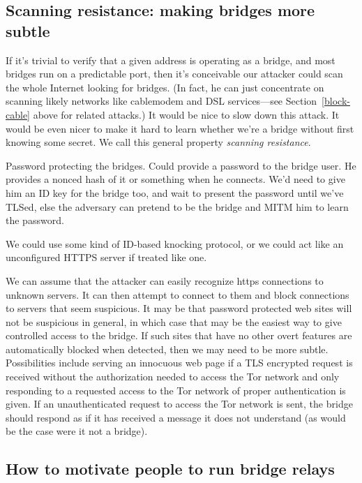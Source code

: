 \documentclass{llncs}
\begin{document}
\subsection{Scanning resistance: making bridges more subtle}

If it's trivial to verify that a given address is operating as a bridge,
and most bridges run on a predictable port, then it's conceivable our
attacker could scan the whole Internet looking for bridges. (In fact, he
can just concentrate on scanning likely networks like cablemodem and DSL
services---see Section~\ref{block-cable} above for related attacks.) It
would be nice to slow down this attack. It would be even nicer to make
it hard to learn whether we're a bridge without first knowing some
secret. We call this general property \emph{scanning resistance}.

Password protecting the bridges.
Could provide a password to the bridge user. He provides a nonced hash of
it or something when he connects. We'd need to give him an ID key for the
bridge too, and wait to present the password until we've TLSed, else the
adversary can pretend to be the bridge and MITM him to learn the password.

We could use some kind of ID-based knocking protocol, or we could act like an
unconfigured HTTPS server if treated like one.

We can assume that the attacker can easily recognize https connections
to unknown servers. It can then attempt to connect to them and block
connections to servers that seem suspicious. It may be that password
protected web sites will not be suspicious in general, in which case
that may be the easiest way to give controlled access to the bridge.
If such sites that have no other overt features are automatically
blocked when detected, then we may need to be more subtle.
Possibilities include serving an innocuous web page if a TLS encrypted
request is received without the authorization needed to access the Tor
network and only responding to a requested access to the Tor network
of proper authentication is given. If an unauthenticated request to
access the Tor network is sent, the bridge should respond as if
it has received a message it does not understand (as would be the
case were it not a bridge).


\subsection{How to motivate people to run bridge relays}
\label{subsec:incentives}
\end{document}
